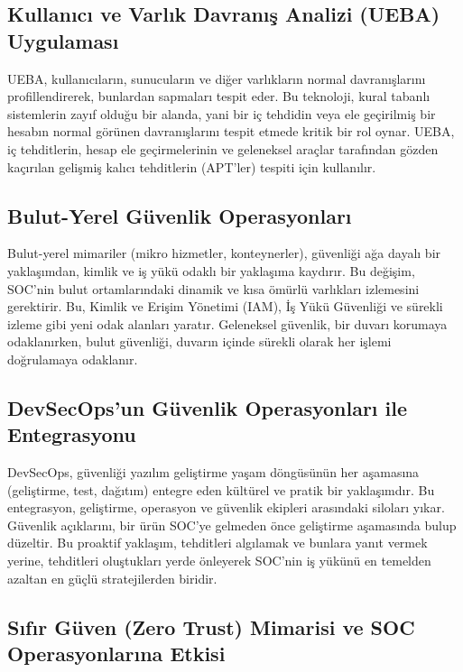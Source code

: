 \subsection{Kullanıcı ve Varlık Davranış Analizi (UEBA) Uygulaması}

UEBA, kullanıcıların, sunucuların ve diğer varlıkların normal davranışlarını profillendirerek, bunlardan sapmaları tespit eder. Bu teknoloji, kural tabanlı sistemlerin zayıf olduğu bir alanda, yani bir iç tehdidin veya ele geçirilmiş bir hesabın normal görünen davranışlarını tespit etmede kritik bir rol oynar. UEBA, iç tehditlerin, hesap ele geçirmelerinin ve geleneksel araçlar tarafından gözden kaçırılan gelişmiş kalıcı tehditlerin (APT'ler) tespiti için kullanılır.

\subsection{Bulut-Yerel Güvenlik Operasyonları}

Bulut-yerel mimariler (mikro hizmetler, konteynerler), güvenliği ağa dayalı bir yaklaşımdan, kimlik ve iş yükü odaklı bir yaklaşıma kaydırır. Bu değişim, SOC'nin bulut ortamlarındaki dinamik ve kısa ömürlü varlıkları izlemesini gerektirir. Bu, Kimlik ve Erişim Yönetimi (IAM), İş Yükü Güvenliği ve sürekli izleme gibi yeni odak alanları yaratır. Geleneksel güvenlik, bir duvarı korumaya odaklanırken, bulut güvenliği, duvarın içinde sürekli olarak her işlemi doğrulamaya odaklanır.

\subsection{DevSecOps'un Güvenlik Operasyonları ile Entegrasyonu}

DevSecOps, güvenliği yazılım geliştirme yaşam döngüsünün her aşamasına (geliştirme, test, dağıtım) entegre eden kültürel ve pratik bir yaklaşımdır. Bu entegrasyon, geliştirme, operasyon ve güvenlik ekipleri arasındaki siloları yıkar. Güvenlik açıklarını, bir ürün SOC'ye gelmeden önce geliştirme aşamasında bulup düzeltir. Bu proaktif yaklaşım, tehditleri algılamak ve bunlara yanıt vermek yerine, tehditleri oluştukları yerde önleyerek SOC'nin iş yükünü en temelden azaltan en güçlü stratejilerden biridir.

\subsection{Sıfır Güven (Zero Trust) Mimarisi ve SOC Operasyonlarına Etkisi}


